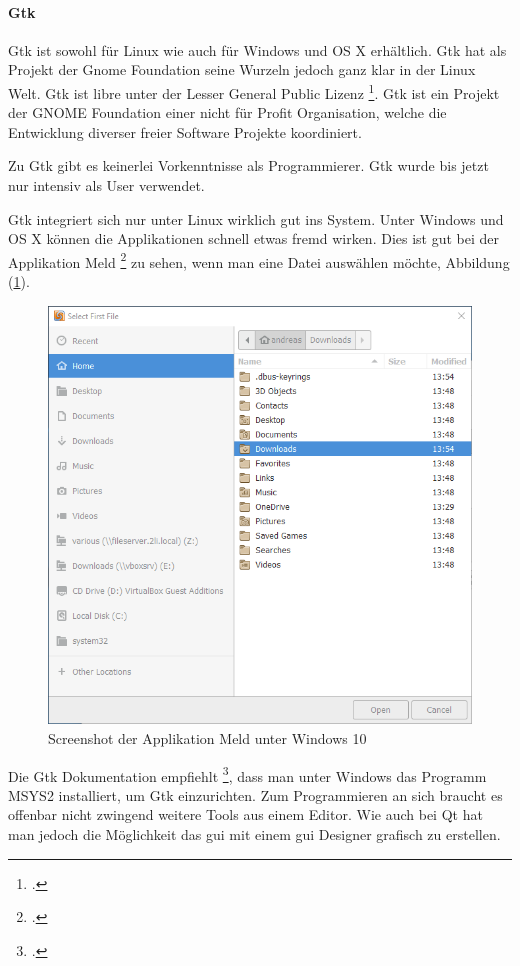 \paragraph{Gtk}
\label{sec:orgb489720}

Gtk ist sowohl für Linux wie auch für Windows und OS X erhältlich. Gtk hat als
Projekt der Gnome Foundation seine Wurzeln jedoch ganz klar in der Linux Welt.
Gtk ist \gls{libre} unter der Lesser General Public Lizenz \footcite{gtklicense}.
Gtk ist ein Projekt der GNOME Foundation einer nicht für Profit Organisation,
welche die Entwicklung diverser freier Software Projekte koordiniert.

Zu Gtk gibt es keinerlei Vorkenntnisse als Programmierer. Gtk wurde bis jetzt
nur intensiv als User verwendet.

Gtk integriert sich nur unter Linux wirklich gut ins System. Unter Windows und
OS X können die Applikationen schnell etwas fremd wirken. Dies ist gut bei der
Applikation Meld \footcite{meld} zu sehen, wenn man eine Datei auswählen möchte,
Abbildung (\ref{fig:org0603414}).

\begin{figure}[htbp]
\centering
\includegraphics[width=.9\linewidth]{pictures/meld.png}
\caption{\label{fig:org0603414}
Screenshot der Applikation Meld unter Windows 10}
\end{figure}
Die Gtk Dokumentation empfiehlt \footcite{gtk_setup}, dass man unter Windows das
Programm MSYS2 installiert, um Gtk einzurichten. Zum Programmieren an sich
braucht es offenbar nicht zwingend weitere Tools aus einem Editor. Wie auch bei
Qt hat man jedoch die Möglichkeit das \gls{gui} mit einem \gls{gui} Designer
grafisch zu erstellen.

